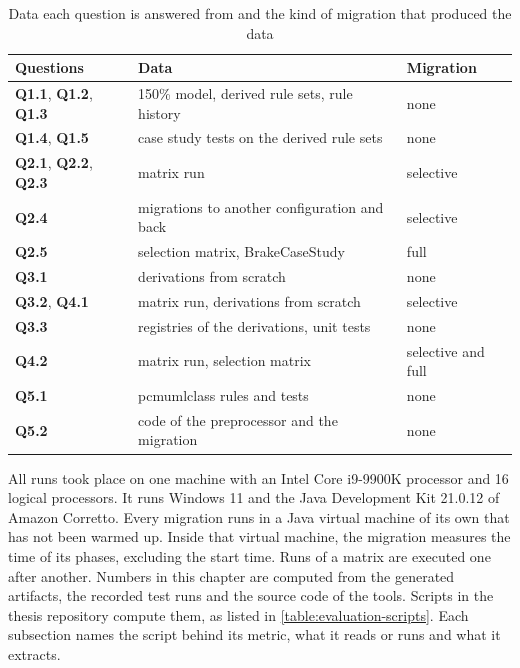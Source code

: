 \begin{table}[htbp]
    \centering
    \begin{tabular}{|l|l|l|}
        \hline
        \textbf{Questions}                          & \textbf{Data}                                & \textbf{Migration} \\
        \hline
        \textbf{Q1.1}, \textbf{Q1.2}, \textbf{Q1.3} & 150\% model, derived rule sets, rule history & none               \\
        \hline
        \textbf{Q1.4}, \textbf{Q1.5}                & case study tests on the derived rule sets    & none               \\
        \hline
        \textbf{Q2.1}, \textbf{Q2.2}, \textbf{Q2.3} & matrix run                                   & selective          \\
        \hline
        \textbf{Q2.4}                               & migrations to another configuration and back & selective          \\
        \hline
        \textbf{Q2.5}                               & selection matrix, BrakeCaseStudy             & full               \\
        \hline
        \textbf{Q3.1}                               & derivations from scratch                     & none               \\
        \hline
        \textbf{Q3.2}, \textbf{Q4.1}                & matrix run, derivations from scratch         & selective          \\
        \hline
        \textbf{Q3.3}                               & registries of the derivations, unit tests    & none               \\
        \hline
        \textbf{Q4.2}                               & matrix run, selection matrix                 & selective and full \\
        \hline
        \textbf{Q5.1}                               & pcmumlclass rules and tests                  & none               \\
        \hline
        \textbf{Q5.2}                               & code of the preprocessor and the migration   & none               \\
        \hline
    \end{tabular}
    \caption{Data each question is answered from and the kind of migration that produced the data}
    \label{table:evaluation-data}
\end{table}

All runs took place on one machine with an Intel Core i9-9900K processor and 16 logical processors.
It runs Windows 11 and the Java Development Kit 21.0.12 of Amazon Corretto.
Every migration runs in a Java virtual machine of its own that has not been warmed up.
Inside that virtual machine, the migration measures the time of its phases, excluding the start time.
Runs of a matrix are executed one after another.
Numbers in this chapter are computed from the generated artifacts, the recorded test runs and the source code of the tools.
Scripts in the thesis repository \cite{thesis-repo} compute them, as listed in \autoref{table:evaluation-scripts}.
Each subsection names the script behind its metric, what it reads or runs and what it extracts.

